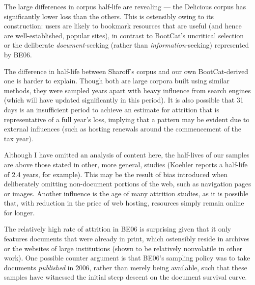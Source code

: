 The large differences in corpus half-life are revealing --- the Delicious corpus has significantly lower loss than the others.  This is ostensibly owing to its construction: users are likely to bookmark resources that are useful (and hence are well-established, popular sites), in contrast to BootCat's uncritical selection or the deliberate {\it document}-seeking (rather than {\it information}-seeking) represented by BE06.


The difference in half-life between Sharoff's corpus and our own BootCat-derived one is harder to explain.  Though both are large corpora built using similar methods, they were sampled years apart with heavy influence from search engines (which will have updated significantly in this period).  It is also possible that 31 days is an insufficient period to achieve an estimate for attrition that is representative of a full year's loss, implying that a pattern may be evident due to external influences (such as hosting renewals around the commencement of the tax year).%


Although I have omitted an analysis of content here, the half-lives of our samples are above those stated in other, more general, studies (Koehler reports a half-life of 2.4 years, for example).
This may be the result of bias introduced when deliberately omitting non-document portions of the web, such as navigation pages or images.  Another influence is the age of many attrition studies, as it is possible that, with reduction in the price of web hosting, resources simply remain online for longer.


The relatively high rate of attrition in BE06 is surprising given that it only features documents that were already in print, which ostensibly reside in archives or the websites of large institutions (shown to be relatively nonvolatile in other work).  One possible counter argument is that BE06's sampling policy was to take documents {\it published} in 2006, rather than merely being available, such that these samples have witnessed the initial steep descent on the document survival curve. %

